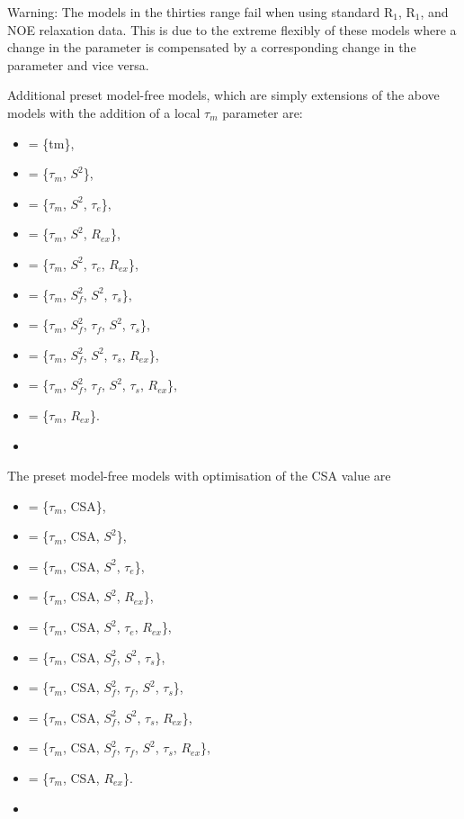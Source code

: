  Warning:  The models in the thirties range fail when using standard R$_1$, R$_1$, and NOE relaxation data.  This is due to the extreme flexibly of these models where a change in the parameter  is compensated by a corresponding change in the parameter  and vice versa. 
  

 Additional preset model-free models, which are simply extensions of the above models with the addition of a local $\tau_m$ parameter are: 
  

 \begin{itemize} 
 \item[]  = \{tm\},  
 \item[]  = \{$\tau_m$, $S^2$\},  
 \item[]  = \{$\tau_m$, $S^2$, $\tau_e$\},  
 \item[]  = \{$\tau_m$, $S^2$, $R_{ex}$\},  
 \item[]  = \{$\tau_m$, $S^2$, $\tau_e$, $R_{ex}$\},  
 \item[]  = \{$\tau_m$, $S^2_f$, $S^2$, $\tau_s$\},  
 \item[]  = \{$\tau_m$, $S^2_f$, $\tau_f$, $S^2$, $\tau_s$\},  
 \item[]  = \{$\tau_m$, $S^2_f$, $S^2$, $\tau_s$, $R_{ex}$\},  
 \item[]  = \{$\tau_m$, $S^2_f$, $\tau_f$, $S^2$, $\tau_s$, $R_{ex}$\},  
 \item[]  = \{$\tau_m$, $R_{ex}$\}.  
 \item[]  
 \end{itemize} 
  

 The preset model-free models with optimisation of the CSA value are 
  

 \begin{itemize} 
 \item[]  = \{$\tau_m$, CSA\},  
 \item[]  = \{$\tau_m$, CSA, $S^2$\},  
 \item[]  = \{$\tau_m$, CSA, $S^2$, $\tau_e$\},  
 \item[]  = \{$\tau_m$, CSA, $S^2$, $R_{ex}$\},  
 \item[]  = \{$\tau_m$, CSA, $S^2$, $\tau_e$, $R_{ex}$\},  
 \item[]  = \{$\tau_m$, CSA, $S^2_f$, $S^2$, $\tau_s$\},  
 \item[]  = \{$\tau_m$, CSA, $S^2_f$, $\tau_f$, $S^2$, $\tau_s$\},  
 \item[]  = \{$\tau_m$, CSA, $S^2_f$, $S^2$, $\tau_s$, $R_{ex}$\},  
 \item[]  = \{$\tau_m$, CSA, $S^2_f$, $\tau_f$, $S^2$, $\tau_s$, $R_{ex}$\},  
 \item[]  = \{$\tau_m$, CSA, $R_{ex}$\}.  
 \item[]  
 \end{itemize} 
  

